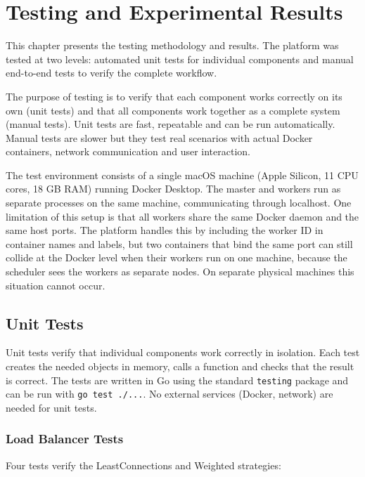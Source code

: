 \chapter{Testing and Experimental Results}
\label{cap:cap4}

This chapter presents the testing methodology and results. The platform was tested at two levels: automated unit tests for individual components and manual end-to-end tests to verify the complete workflow.

The purpose of testing is to verify that each component works correctly on its own (unit tests) and that all components work together as a complete system (manual tests). Unit tests are fast, repeatable and can be run automatically. Manual tests are slower but they test real scenarios with actual Docker containers, network communication and user interaction.

The test environment consists of a single macOS machine (Apple Silicon, 11 CPU cores, 18 GB RAM) running Docker Desktop. The master and workers run as separate processes on the same machine, communicating through localhost. One limitation of this setup is that all workers share the same Docker daemon and the same host ports. The platform handles this by including the worker ID in container names and labels, but two containers that bind the same port can still collide at the Docker level when their workers run on one machine, because the scheduler sees the workers as separate nodes. On separate physical machines this situation cannot occur.

\section{Unit Tests}

Unit tests verify that individual components work correctly in isolation. Each test creates the needed objects in memory, calls a function and checks that the result is correct. The tests are written in Go using the standard \texttt{testing} package and can be run with \texttt{go test ./...}. No external services (Docker, network) are needed for unit tests.

\subsection{Load Balancer Tests}

Four tests verify the LeastConnections and Weighted strategies:

